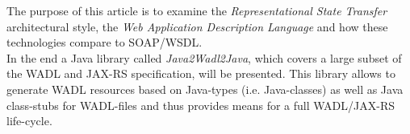 The purpose of this article is to examine the \emph{Representational State Transfer} architectural style, the \emph{Web Application Description Language} and how these technologies compare to SOAP/WSDL.
\\
In the end a Java library called \emph{Java2Wadl2Java}, which covers a large subset of the WADL and JAX-RS specification, will be presented. This library allows to generate WADL resources based on Java-types (i.e. Java-classes) as well as Java class-stubs for WADL-files and thus provides means for a full WADL/JAX-RS life-cycle.